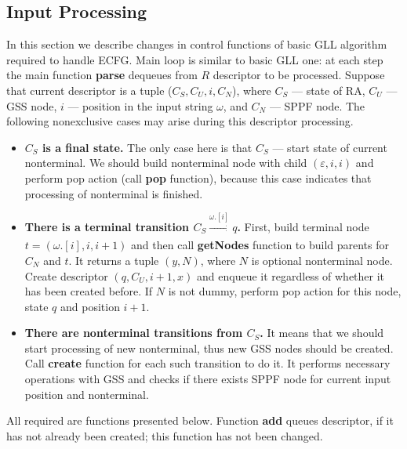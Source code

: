 \documentclass[runningheads,a4paper]{llncs}
\begin{document}
\subsection{Input Processing}%

In this section we describe changes in control functions of basic GLL algorithm required to handle ECFG.
Main loop is similar to basic GLL one: at each step the main function \textbf{parse} dequeues from $R$ descriptor to be processed.
Suppose that current descriptor is a tuple ($C_S, C_U, i, C_N$), where $C_S$ --- state of RA,
$C_U$ --- GSS node, $i$ --- position in the input string $\omega$, and $C_N$ --- SPPF node. 
The following nonexclusive cases may arise during this descriptor processing.

\begin{itemize} 
    \item \textbf{$C_S$ is a final state.} The only case here is that $C_S$ --- start state of current nonterminal. 
    We should build nonterminal node with child $(\varepsilon, i, i)$ and perform pop action
    (call \textbf{pop} function), because this case indicates that processing of nonterminal is finished.
    
    \item \textbf{There is a terminal transition $C_S \xrightarrow[]{\omega.[i]} q$.} 
    First, build terminal node $ t = (\omega.[i], i, i+1) $ and then call \textbf{getNodes} function
    to build parents for $ C_N $ and $ t $. It returns a tuple $ (y, N) $, where $N$ is optional nonterminal node.
    Create descriptor $ (q, C_U, i+1, x) $ and enqueue it regardless of whether it has been created before.
    If $ N $ is not dummy, perform pop action for this node, state $ q $ and position $i + 1 $.
    
    \item\textbf{ There are nonterminal transitions from $C_S$.}
    It means that we should start processing of new nonterminal, thus new GSS nodes should be created.
    Call \textbf{create} function for each such transition to do it.
    It performs necessary operations with GSS and checks if there exists SPPF node for current input position and nonterminal.
\end{itemize}

All required are functions presented below.
Function \textbf{add} queues descriptor, if it has not already been created; this function has not been changed.

\end{document}
